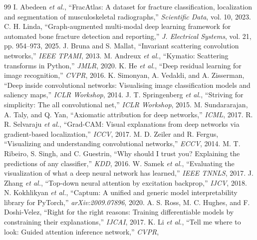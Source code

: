\documentclass[conference]{IEEEtran}
\begin{document}
\begin{thebibliography}{99}
 I. Abedeen \emph{et al.}, ``FracAtlas: A dataset for fracture classification,
localization and segmentation of musculoskeletal radiographs,'' \emph{Scientific Data}, vol. 10, 2023.
 C. H. Linda, ``Graph-augmented multi-modal deep learning framework for automated bone fracture
detection and reporting,'' \emph{J. Electrical Systems}, vol. 21, pp. 954--973, 2025.
 J. Bruna and S. Mallat, ``Invariant scattering convolution networks,'' \emph{IEEE TPAMI},
2013.
 M. Andreux \emph{et al.}, ``Kymatio: Scattering transforms in Python,'' \emph{JMLR}, 2020.
 K. He \emph{et al.}, ``Deep residual learning for image recognition,'' \emph{CVPR}, 2016.
 K. Simonyan, A. Vedaldi, and A. Zisserman, ``Deep inside convolutional networks:
Visualising image classification models and saliency maps,'' \emph{ICLR Workshop}, 2014.
 J. T. Springenberg \emph{et al.}, ``Striving for simplicity: The all convolutional
net,'' \emph{ICLR Workshop}, 2015.
 M. Sundararajan, A. Taly, and Q. Yan, ``Axiomatic attribution for deep networks,''
\emph{ICML}, 2017.
 R. R. Selvaraju \emph{et al.}, ``Grad-CAM: Visual explanations from deep networks via
gradient-based localization,'' \emph{ICCV}, 2017.
 M. D. Zeiler and R. Fergus, ``Visualizing and understanding convolutional networks,''
\emph{ECCV}, 2014.
 M. T. Ribeiro, S. Singh, and C. Guestrin, ``Why should I trust you? Explaining the
predictions of any classifier,'' \emph{KDD}, 2016.
 W. Samek \emph{et al.}, ``Evaluating the visualization of what a deep neural network has
learned,'' \emph{IEEE TNNLS}, 2017.
 J. Zhang \emph{et al.}, ``Top-down neural attention by excitation backprop,'' \emph{IJCV},
2018.
 N. Kokhlikyan \emph{et al.}, ``Captum: A unified and generic model interpretability
library for PyTorch,'' \emph{arXiv:2009.07896}, 2020.
 A. S. Ross, M. C. Hughes, and F. Doshi-Velez, ``Right for the right reasons: Training
differentiable models by constraining their explanations,'' \emph{IJCAI}, 2017.
 K. Li \emph{et al.}, ``Tell me where to look: Guided attention inference network,'' \emph{CVPR},

\end{thebibliography}
\end{document}
